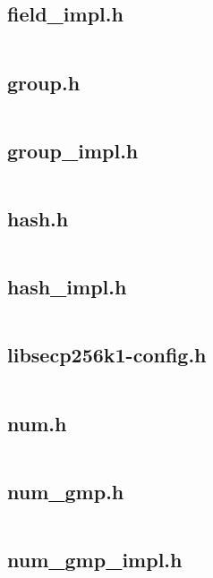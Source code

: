 \documentclass{article}
\begin{document}
\subsection{field\_impl.h}
\inputminted{cpp}{/home/dufferzafar/dev/@clones/bitcoin/src/secp256k1/src/field_impl.h}
\newpage

\subsection{group.h}
\inputminted{cpp}{/home/dufferzafar/dev/@clones/bitcoin/src/secp256k1/src/group.h}
\newpage

\subsection{group\_impl.h}
\inputminted{cpp}{/home/dufferzafar/dev/@clones/bitcoin/src/secp256k1/src/group_impl.h}
\newpage

\subsection{hash.h}
\inputminted{cpp}{/home/dufferzafar/dev/@clones/bitcoin/src/secp256k1/src/hash.h}
\newpage

\subsection{hash\_impl.h}
\inputminted{cpp}{/home/dufferzafar/dev/@clones/bitcoin/src/secp256k1/src/hash_impl.h}
\newpage

\subsection{libsecp256k1-config.h}
\inputminted{cpp}{/home/dufferzafar/dev/@clones/bitcoin/src/secp256k1/src/libsecp256k1-config.h}
\newpage

\subsection{num.h}
\inputminted{cpp}{/home/dufferzafar/dev/@clones/bitcoin/src/secp256k1/src/num.h}
\newpage

\subsection{num\_gmp.h}
\inputminted{cpp}{/home/dufferzafar/dev/@clones/bitcoin/src/secp256k1/src/num_gmp.h}
\newpage

\subsection{num\_gmp\_impl.h}
\inputminted{cpp}{/home/dufferzafar/dev/@clones/bitcoin/src/secp256k1/src/num_gmp_impl.h}
\newpage
\end{document}
